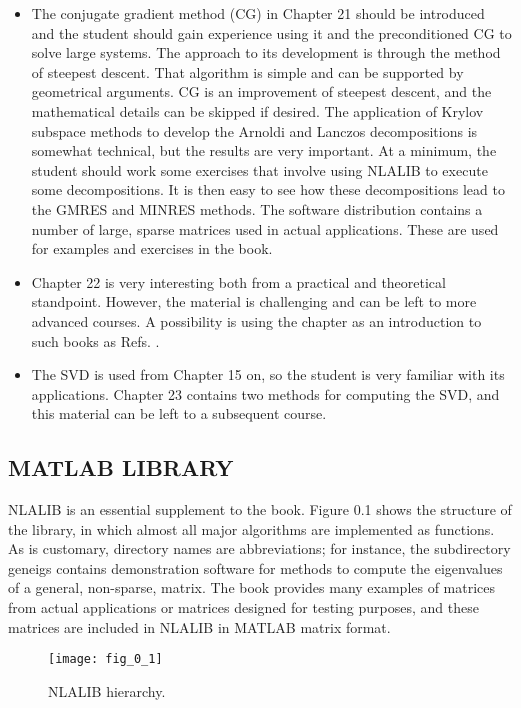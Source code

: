 \documentclass[../main.tex]{subfiles}
\begin{document}
\begin{itemize}[noitemsep]
	\item The conjugate gradient method (CG) in Chapter 21 should be introduced and the student should gain experience using it and the preconditioned CG to solve large systems. The approach to its development is through the method of steepest descent. That algorithm is simple and can be supported by geometrical arguments. CG is an improvement of steepest descent, and the mathematical details can be skipped if desired. The application of Krylov subspace methods to develop the Arnoldi and Lanczos decompositions is somewhat technical, but the results are very important. At a minimum, the student should work some exercises that involve using NLALIB to execute some decompositions. It is then easy to see how these decompositions lead to the GMRES and MINRES methods. The software distribution contains a number of large, sparse matrices used in actual applications. These are used for examples and exercises in the book.

	\item Chapter 22 is very interesting both from a practical and theoretical standpoint. However, the material is challenging and can be left to more advanced courses. A possibility is using the chapter as an introduction to such books as Refs. \cite{ref3, ref4, ref5, ref6}.

	\item The SVD is used from Chapter 15 on, so the student is very familiar with its applications. Chapter 23 contains two methods for computing the SVD, and this material can be left to a subsequent course.
\end{itemize}
	
\subsection*{MATLAB LIBRARY}
NLALIB is an essential supplement to the book. Figure 0.1 shows the structure of the library, in which almost all major algorithms are implemented as functions. As is customary, directory names are abbreviations; for instance, the subdirectory geneigs contains demonstration software for methods to compute the eigenvalues of a general, non-sparse, matrix. The book provides many examples of matrices from actual applications or matrices designed for testing purposes, and these matrices are included in NLALIB in MATLAB matrix format.

\begin{figure}
	\centering
	\texttt{[image: fig\_0\_1]}
	\caption{NLALIB hierarchy.}
	\label{fig:fig_0_1}
\end{figure}
\end{document}
